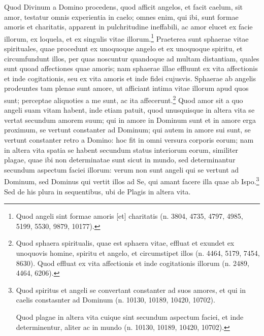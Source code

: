 \begin{topic}{17}
    Quod Divinum a Domino procedens, quod afficit angelos, et facit caelum, sit amor, testatur omnis experientia in
    caelo; omnes enim, qui ibi, sunt formae amoris et charitatis, apparent in pulchritudine ineffabili, ac amor elucet
    ex facie illorum, ex loquela, et ex singulis vitae illorum.\footnote{Quod angeli sint formae amoris [et] charitatis
    (n. 3804, 4735, 4797, 4985, 5199, 5530, 9879, 10177).}
    Praeterea sunt sphaerae vitae spirituales, quae procedunt ex unoquoque angelo et ex unoquoque spiritu, et
    circumfundunt illos, per quas noscuntur quandoque ad multam distantiam, quales sunt quoad affectiones quae amoris;
    nam sphaerae illae effluunt ex vita affectionis et inde cogitationis, seu ex vita amoris et inde fidei cujusvis.
    Sphaerae ab angelis prodeuntes tam plenae sunt amore, ut afficiant intima vitae illorum apud quos sunt; perceptae
    aliquoties a me sunt, ac ita affecerunt.\footnote{Quod sphaera spiritualis, quae est sphaera vitae, effluat et
    exundet ex unoquovis homine, spiritu et angelo, et circumstipet illos (n. 4464, 5179, 7454, 8630).
    Quod effluat ex vita affectionis et inde cogitationis illorum (n. 2489, 4464, 6206).}
    Quod amor sit a quo angeli suam vitam habent, inde etiam patuit, quod unusquisque in altera vita se vertat secundum
    amorem suum; qui in amore in Dominum sunt et in amore erga proximum, se vertunt constanter ad Dominum; qui autem in
    amore sui sunt, se vertunt constanter retro a Domino: hoc fit in omni versura corporis eorum; nam in altera vita
    spatia se habent secundum status interiorum eorum, similiter plagae, quae ibi non determinatae sunt sicut in mundo,
    sed determinantur secundum aspectum faciei illorum: verum non sunt angeli qui se vertunt ad Dominum, sed Dominus qui
    vertit illos ad Se, qui amant facere illa quae ab Ispo.\footnote{Quod spiritus et angeli se convertant constanter ad
    suos amores, et qui in caelis constasnter ad Dominum (n. 10130, 10189, 10420, 10702).

    Quod plagae in altera vita cuique sint secundum aspectum faciei, et inde determinentur, aliter ac in mundo (n.
    10130, 10189, 10420, 10702).}
    Sed de his plura in sequentibus, ubi de Plagis in altera vita.
\end{topic}


